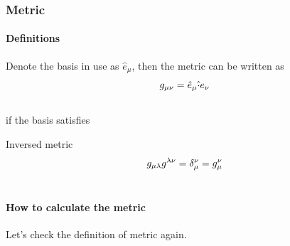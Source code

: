 \documentclass[letterpaper,10pt,english]{sphinxmanual}
\begin{document}
\subsubsection{Metric}
\label{math:metric}

\paragraph{Definitions}
\label{math:definitions}
Denote the basis in use as $\hat e_\mu$, then the metric can be written as
\begin{gather}
\begin{split}g_{\mu\nu}=\hat e_\mu \hat \cdot e_\nu\end{split}\notag\\\begin{split}\end{split}\notag
\end{gather}
if the basis satisfies

Inversed metric
\begin{gather}
\begin{split}g_{\mu\lambda}g^{\lambda\nu}=\delta_\mu^\nu = g_\mu^\nu\end{split}\notag\\\begin{split}\end{split}\notag
\end{gather}

\paragraph{How to calculate the metric}
\label{math:how-to-calculate-the-metric}
Let's check the definition of metric again.
\end{document}
